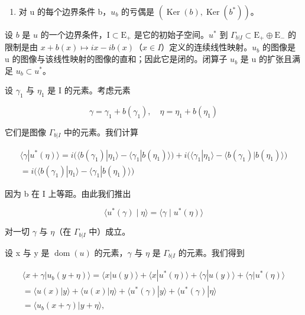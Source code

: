 \begin{enumerate}
\def\labelenumi{\alph{enumi})}
\setcounter{enumi}{3}
\tightlist
\item
  对 u 的每个边界条件 b，\(u_{b}\) 的亏偶是 \((\operatorname{Ker}(b), \operatorname{Ker}(b^{*}))\)。
\end{enumerate}

设 \(b\) 是 \(u\) 的一个边界条件，\(\mathrm{I} \subset \mathrm{E}_{+}\) 是它的初始子空间。\(u^{*}\) 到 \(\Gamma_{b|I} \subset \mathrm{E}_{+} \oplus \mathrm{E}_{-}\) 的限制是由 \(x + b(x) \mapsto ix - ib(x)\)（\(x \in I\)）定义的连续线性映射。\(u_{b}\) 的图像是 u 的图像与该线性映射的图像的直和；因此它是闭的。闭算子 \(u_{b}\) 是 u 的扩张且满足 \(u_{b} \subset u^{*}\)。

设 \(\gamma_{1}\) 与 \(\eta_{1}\) 是 I 的元素。考虑元素

\[
\gamma = \gamma_ {1} + b (\gamma_ {1}), \quad \eta = \eta_ {1} + b (\eta_ {1})
\]

它们是图像 \(\Gamma_{b|I}\) 中的元素。我们计算

\[
\begin{array}{c} \langle \gamma | u ^ {*} (\eta) \rangle = i \big (\langle b (\gamma_ {1}) | \eta_ {1} \rangle - \langle \gamma_ {1} | b (\eta_ {1}) \rangle \big) + i \big (\langle \gamma_ {1} | \eta_ {1} \rangle - \langle b (\gamma_ {1}) | b (\eta_ {1}) \rangle \big) \\ = i \big (\langle b (\gamma_ {1}) | \eta_ {1} \rangle - \langle \gamma_ {1} | b (\eta_ {1}) \rangle \big) \end{array}
\]

因为 b 在 I 上等距。由此我们推出

\[
\langle u ^ {*} (\gamma) \mid \eta \rangle = \langle \gamma \mid u ^ {*} (\eta) \rangle\tag{12}
\]

对一切 \(\gamma\) 与 \(\eta\)（在 \(\Gamma_{b|I}\) 中）成立。

设 x 与 y 是 \(\operatorname{dom}(u)\) 的元素，\(\gamma\) 与 \(\eta\) 是 \(\Gamma_{b|I}\) 的元素。我们得到

\[
\begin{array}{c} \langle x + \gamma | u _ {b} (y + \eta) \rangle = \langle x | u (y) \rangle + \langle x | u ^ {*} (\eta) \rangle + \langle \gamma | u (y) \rangle + \langle \gamma | u ^ {*} (\eta) \rangle \\ = \langle u (x) | y \rangle + \langle u (x) | \eta \rangle + \langle u ^ {*} (\gamma) | y \rangle + \langle u ^ {*} (\gamma) | \eta \rangle \\ = \langle u _ {b} (x + \gamma) | y + \eta \rangle , \end{array}
\]


